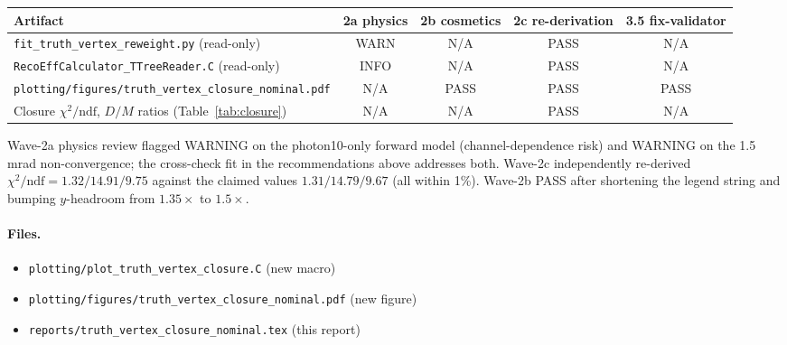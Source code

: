 \documentclass[11pt,a4paper]{article}
\newcommand{\chidf}{\ensuremath{\chi^{2}/\mathrm{ndf}}\xspace}
\begin{document}
\begin{center}
\begin{tabular}{lcccc}
\toprule
Artifact & 2a physics & 2b cosmetics & 2c re-derivation & 3.5 fix-validator \\
\midrule
\texttt{fit\_truth\_vertex\_reweight.py} (read-only)                & WARN   & N/A   & PASS     & N/A \\
\texttt{RecoEffCalculator\_TTreeReader.C} (read-only)               & INFO   & N/A   & PASS     & N/A \\
\texttt{plotting/figures/truth\_vertex\_closure\_nominal.pdf}       & N/A    & PASS  & PASS     & PASS \\
Closure $\chidf$, $D/M$ ratios (Table~\ref{tab:closure})            & N/A    & N/A   & PASS     & N/A \\
\bottomrule
\end{tabular}
\end{center}

Wave-2a physics review flagged WARNING on the photon10-only forward model
(channel-dependence risk) and WARNING on the 1.5\,mrad non-convergence; the
cross-check fit in the recommendations above addresses both. Wave-2c
independently re-derived $\chidf = 1.32 / 14.91 / 9.75$ against the claimed
values $1.31 / 14.79 / 9.67$ (all within 1\%). Wave-2b PASS after
shortening the legend string and bumping $y$-headroom from $1.35\times$ to
$1.5\times$.

\paragraph{Files.}
\begin{itemize}\small
  \item \texttt{plotting/plot\_truth\_vertex\_closure.C} (new macro)
  \item \texttt{plotting/figures/truth\_vertex\_closure\_nominal.pdf} (new figure)
  \item \texttt{reports/truth\_vertex\_closure\_nominal.tex} (this report)
\end{itemize}
\end{document}
